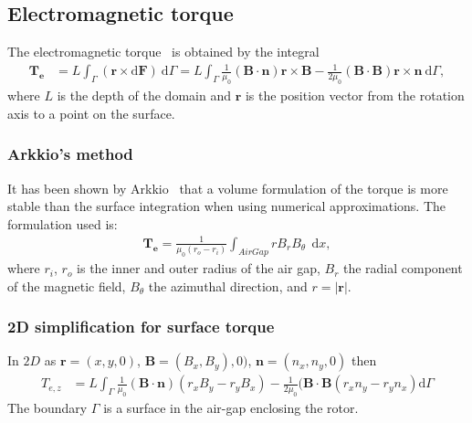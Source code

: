 \documentclass{article}
\newcommand{\mbf}[1]{\mathbf{#1}}
\newcommand{\dx}[0]{~\mathrm{d}x}
\begin{document}
\subsection{Electromagnetic torque}

The electromagnetic torque~\cite{reichert1976calculation} is obtained by
the integral
\begin{align}
    \mbf{T_e} &=L \int_\Gamma \left(\mbf{r} \times \mathrm{d} \mbf{F} \right)~\mathrm{d}\Gamma= L\int_{\Gamma} \frac{1}{\mu_0}(\mbf{B}\cdot\mbf{n})\mbf{r}\times\mbf{B}- \frac{1}{2\mu_0}(\mbf{B}\cdot\mbf{B})\mbf{r}\times\mbf{n}~\mathrm{d}\Gamma,
\end{align}
where $L$ is the depth of the domain and $\mbf{r}$ is the position
vector from the rotation axis to a point on the surface.

\subsubsection{Arkkio’s method}
It has been shown by Arkkio~\cite{Arkkio1987} that a volume formulation
of the torque is more stable than the surface integration when using
numerical approximations. The formulation used is:
\begin{align}
    \mathbf{T_e} = \frac{1}{\mu_0(r_o-r_i)}\int_{AirGap} rB_rB_\theta~\dx,
\end{align}
where $r_i$, $r_o$ is the inner and outer radius of the air gap, $B_r$
the radial component of the magnetic field, $B_\theta$ the azimuthal
direction, and $r=\vert \mbf{r}\vert$.

\subsubsection{2D simplification for surface torque}

In $2D$ as $\mbf{r}=(x,y,0)$, $\mbf{B}=(B_x, B_y), 0)$,
$\mbf{n}=(n_x,n_y,0)$ then
\begin{align}
    T_{e,z}&= L\int_{\Gamma} \frac{1}{\mu_0}(\mbf{B}\cdot\mbf{n})(r_x B_y - r_y B_x) - \frac{1}{2\mu_0}(\mbf{B}\cdot\mbf{B}(r_xn_y-r_yn_x) \mathrm{d}\Gamma
\end{align}
The boundary $\Gamma$ is a surface in the air-gap enclosing the rotor.

\end{document}
